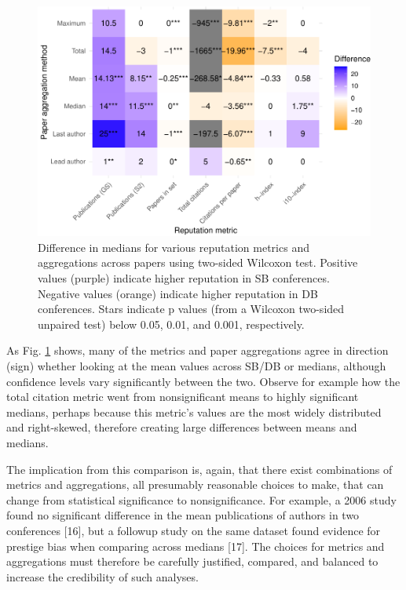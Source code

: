 \documentclass[12pt]{article}
\begin{document}
\begin{figure}
\centering
\includegraphics{prestige_files/figure-latex/median-diffs-1.pdf}
\caption{\label{fig:median-diffs}Difference in medians for various reputation metrics and aggregations across papers using two-sided Wilcoxon test. Positive values (purple) indicate higher reputation in SB conferences. Negative values (orange) indicate higher reputation in DB conferences. Stars indicate p values (from a Wilcoxon two-sided unpaired test) below 0.05, 0.01, and 0.001, respectively.}
\end{figure}

As Fig. \ref{fig:median-diffs} shows, many of the metrics and paper aggregations agree in direction (sign) whether looking at the mean values across SB/DB or medians, although confidence levels vary significantly between the two.
Observe for example how the total citation metric went from nonsignificant means to highly significant medians, perhaps because this metric's values are the most widely distributed and right-skewed, therefore creating large differences between means and medians.

The implication from this comparison is, again, that there exist combinations of metrics and aggregations, all presumably reasonable choices to make, that can change from statistical significance to nonsignificance.
For example, a 2006 study found no significant difference in the mean publications of authors in two conferences {[}16{]}, but a followup study on the same dataset found evidence for prestige bias when comparing across medians {[}17{]}.
The choices for metrics and aggregations must therefore be carefully justified, compared, and balanced to increase the credibility of such analyses.
\end{document}
